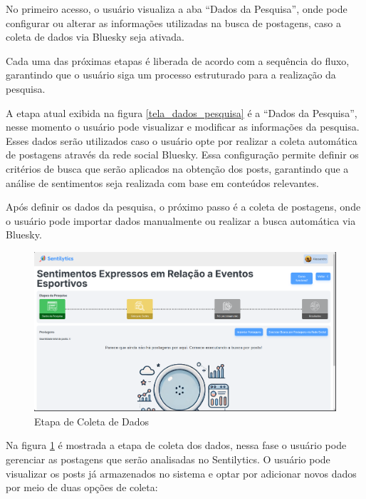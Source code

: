 \documentclass[
	12pt,				%
	oneside,			%
	a4paper,			%
	english,			%
	french,				%
	spanish,			%
	brazil				%
	]{abntex2}
\begin{document}
No primeiro acesso, o usuário visualiza a aba ``Dados da Pesquisa'',
onde pode configurar ou alterar as informações utilizadas na busca de
postagens, caso a coleta de dados via Bluesky seja ativada.

Cada uma das próximas etapas é liberada de acordo com a sequência do
fluxo, garantindo que o usuário siga um processo estruturado para a
realização da pesquisa.

A etapa atual exibida na figura \ref{tela_dados_pesquisa} é a ``Dados da
Pesquisa'', nesse momento o usuário pode visualizar e modificar as
informações da pesquisa. Esses dados serão utilizados caso o usuário
opte por realizar a coleta automática de postagens através da rede
social Bluesky. Essa configuração permite definir os critérios de busca
que serão aplicados na obtenção dos posts, garantindo que a análise de
sentimentos seja realizada com base em conteúdos relevantes.

Após definir os dados da pesquisa, o próximo passo é a coleta de
postagens, onde o usuário pode importar dados manualmente ou realizar a
busca automática via Bluesky.

\begin{figure}[htbp]
\hypertarget{tela_coleta_dados_pesquisa}{%
\caption{Etapa de Coleta de Dados}\label{tela_coleta_dados_pesquisa}
\begin{center}
\includegraphics[scale=0.2]{imagens/sentilytics/interface-grafica/coleta-dados.png}
\end{center}
}
\end{figure}

Na figura \ref{tela_coleta_dados_pesquisa} é mostrada a etapa de coleta
dos dados, nessa fase o usuário pode gerenciar as postagens que serão
analisadas no Sentilytics. O usuário pode visualizar os posts já
armazenados no sistema e optar por adicionar novos dados por meio de
duas opções de coleta:
\end{document}
